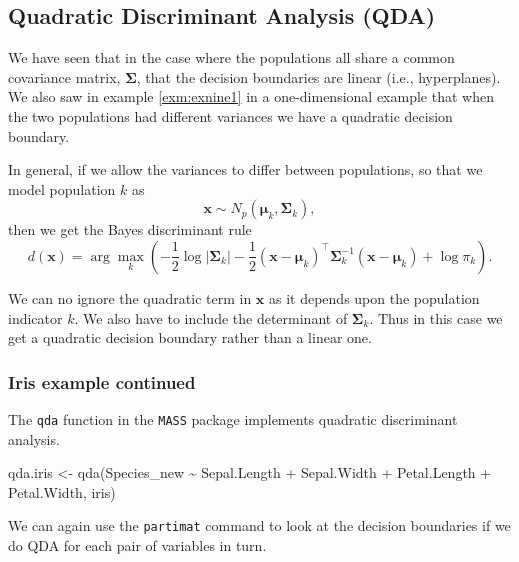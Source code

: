 \documentclass[
]{book}
\newenvironment{Shaded}{\begin{snugshade}}{\end{snugshade}}
\newcommand{\FunctionTok}[1]{\textcolor[rgb]{0.00,0.00,0.00}{#1}}
\newcommand{\NormalTok}[1]{#1}
\newcommand{\OtherTok}[1]{\textcolor[rgb]{0.56,0.35,0.01}{#1}}
\newcommand{\SpecialCharTok}[1]{\textcolor[rgb]{0.00,0.00,0.00}{#1}}
\theoremstyle{definition}
\theoremstyle{definition}
\theoremstyle{definition}
\theoremstyle{definition}
\theoremstyle{remark}
\begin{document}
\hypertarget{quadratic-discriminant-analysis-qda}{%
\subsection{Quadratic Discriminant Analysis (QDA)}\label{quadratic-discriminant-analysis-qda}}

We have seen that in the case where the populations all share a common covariance matrix, \(\boldsymbol{\Sigma}\), that the decision boundaries are linear (i.e., hyperplanes). We also saw in example \ref{exm:exnine1} in a one-dimensional example that when the two populations had different variances we have a quadratic decision boundary.

In general, if we allow the variances to differ between populations, so that we model population \(k\) as \[\mathbf x\sim N_p({\boldsymbol{\mu}}_k, \boldsymbol{\Sigma}_k),\]
then we get the Bayes discriminant rule
\[
d(\mathbf x)=\arg\max_k \left(-\frac{1}{2} \log |\boldsymbol{\Sigma}_k| - \frac{1}{2}(\mathbf x-{\boldsymbol{\mu}}_k)^\top \boldsymbol{\Sigma}_k^{-1} (\mathbf x-{\boldsymbol{\mu}}_k)+\log \pi_k\right). \]

We can no ignore the quadratic term in \(\mathbf x\) as it depends upon the population indicator \(k\). We also have to include the determinant of \(\boldsymbol{\Sigma}_k\). Thus in this case we get a quadratic decision boundary rather than a linear one.

\hypertarget{iris-example-continued}{%
\subsubsection{Iris example continued}\label{iris-example-continued}}

The \texttt{qda} function in the \texttt{MASS} package implements quadratic discriminant analysis.

\begin{Shaded}
\begin{Highlighting}[]
\NormalTok{qda.iris }\OtherTok{\textless{}{-}} \FunctionTok{qda}\NormalTok{(Species\_new }\SpecialCharTok{\textasciitilde{}}\NormalTok{ Sepal.Length }\SpecialCharTok{+}\NormalTok{ Sepal.Width }\SpecialCharTok{+}\NormalTok{ Petal.Length }
                \SpecialCharTok{+}\NormalTok{ Petal.Width, iris)}
\end{Highlighting}
\end{Shaded}

We can again use the \texttt{partimat} command to look at the decision boundaries if we do QDA for each pair of variables in turn.
\end{document}
